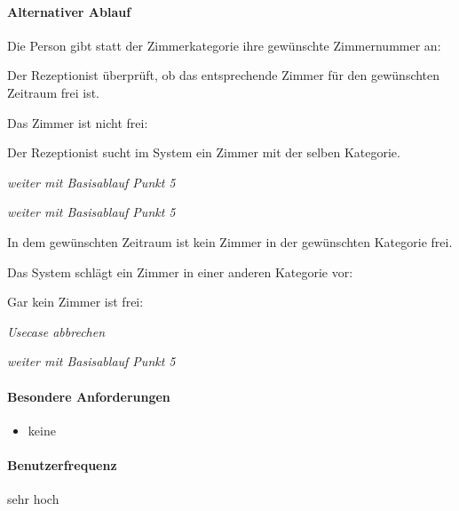 \paragraph{Alternativer Ablauf}
\begin{longenum}
	\item
	\item
	\item
	\begin{longenum}
			\item Die Person gibt statt der Zimmerkategorie ihre gewünschte \Gls{Zimmernummer} an:
			\begin{longenum}
				\item Der \Gls{Rezeptionist} überprüft, ob das entsprechende \Gls{Zimmer} für den gewünschten Zeitraum frei ist.
				\begin{longenum}
					\item Das \Gls{Zimmer} ist nicht frei:
					\begin{longenum}
						\item Der \Gls{Rezeptionist} sucht im System ein \Gls{Zimmer} mit der selben Kategorie.
						\item \emph{weiter mit Basisablauf Punkt 5}
					\end{longenum}
				\end{longenum}

				\item \emph{weiter mit Basisablauf Punkt 5}
			\end{longenum}
				
	\end{longenum}
	\item
	\begin{longenum}
		\item In dem gewünschten Zeitraum ist kein \Gls{Zimmer} in der gewünschten Kategorie frei.
		\begin{longenum}
			\item Das System schlägt ein \Gls{Zimmer} in einer anderen Kategorie vor:
			\begin{longenum}
				\item Gar kein \Gls{Zimmer} ist frei:
				\begin{longenum}
					\item \emph{Usecase abbrechen}
				\end{longenum}
			\end{longenum}
			\item \emph{weiter mit Basisablauf Punkt 5}
		\end{longenum}
	\end{longenum}
	\item
	\item
	\item
	\item
\end{longenum}

\paragraph{Besondere Anforderungen}
\begin{itemize}
	\item keine
\end{itemize}

\paragraph{Benutzerfrequenz}
sehr hoch

\newpage
